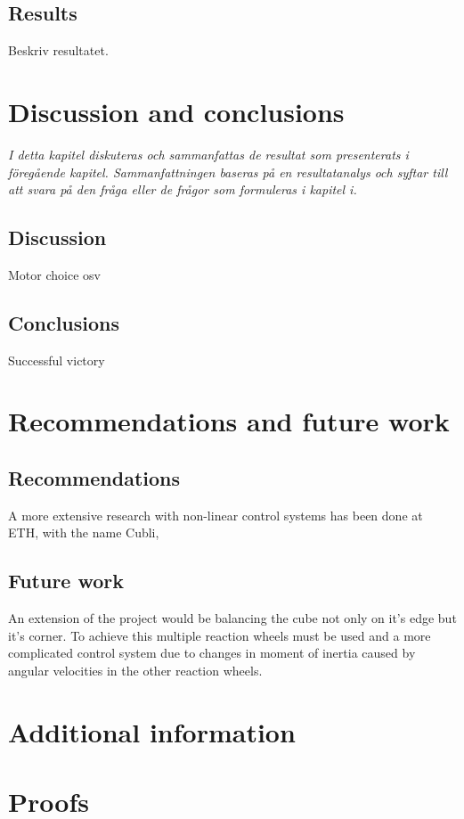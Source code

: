 \documentclass[a4paper,11pt]{kth-mag}
\begin{document}
\section{Results}
Beskriv resultatet.


\chapter{Discussion and conclusions}
\emph{I detta kapitel diskuteras och sammanfattas de resultat som presenterats i föregående kapitel. Sammanfattningen baseras på en resultatanalys och syftar till att svara på den fråga eller de frågor som formuleras i kapitel i.}

\section{Discussion}
Motor choice osv

\section{Conclusions}
Successful victory


\chapter{Recommendations and future work}

\section{Recommendations}
A more extensive research with non-linear control systems has been done at ETH, with the name Cubli,\cite{cubliECC13}

\section{Future work}
An extension of the project would be balancing the cube not only on it's edge but it's corner. To achieve this multiple reaction wheels must be used and a more complicated control system due to changes in moment of inertia caused by angular velocities in the other reaction wheels.

%
\cleardoublepage


\cleardoublepage
\appendix
{}


\chapter{Additional information} \label{appA}

\chapter{Proofs} \label{appB}

\cleardoublepage   
\cleartoverso %
%

\end{document}
